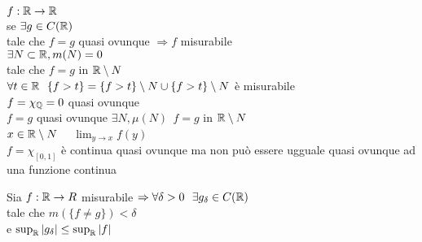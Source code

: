 \documentclass[12px]{article}
\begin{document}
	$f : \mathbb{R} \rightarrow \mathbb{R}$\\
	se $\exists g\in C(\mathbb{R})$\\
	tale che  $f = g$ quasi ovunque  $ \Rightarrow  f$ misurabile\\
	$\exists N\subset \mathbb{R}, m(N) = 0$\\
	tale che  $f = g$ in  $\mathbb{R}\setminus N$ \ \\
	$\forall t\in \mathbb{R} \ \ \{f > t\} = \{f > t\}\setminus N \cup \{f > t\} \setminus N$ è misurabile\\
	 $f = \chi_{\mathbb{Q}} = 0$ quasi ovunque\\
	  $ f = g$ quasi ovunque  $\exists N, \mu (N) \ \ f = g $ in  $\mathbb{R}\setminus N$\\
	  $x\in \mathbb{R} \setminus N$ \ \  $\lim_{y \rightarrow x} f(y)$\\
	  $f = \chi_[0,1]$ è continua quasi ovunque ma non  può essere ugguale quasi ovunque ad una funzione continua
	  \begin{teo}
	  	Sia $f: \mathbb{R} \rightarrow R$ misurabile $  \Rightarrow  \forall \delta > 0 \ \ \exists g_\delta \in C(\R)$\\
		tale che $m(\{f\neq g\}) < \delta$\\
	e	$\sup_{\mathbb{R}}|g_\delta| \leq \sup_{\mathbb{R}}|f|$
	  \end{teo}
\end{document}
